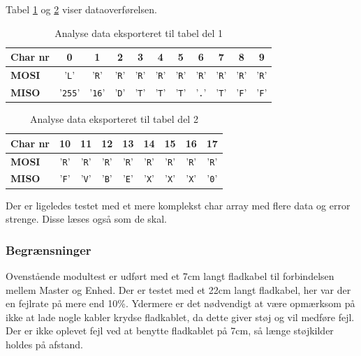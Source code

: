 Tabel \ref{table:scop_getlog1} og \ref{table:scop_getlog2} viser dataoverførelsen. 

\begin{table}[H]
	\caption{Analyse data eksporteret til tabel del 1}
	\centering
	\begin{tabular}{|l|c|c|c|c|c|c|c|c|c|c|}
		\hline 
		\textbf{Char nr} & \textbf{0} & \textbf{1} & \textbf{2} & \textbf{3} & \textbf{4} & \textbf{5} 
						 & \textbf{6} & \textbf{7} & \textbf{8} & \textbf{9}\\ 		
		\hline 
		\textbf{MOSI} & '\verb+L+' & '\verb+R+' & '\verb+R+' & '\verb+R+' & '\verb+R+' & '\verb+R+' 
						& '\verb+R+' & '\verb+R+' & '\verb+R+' & '\verb+R+'\\ 
		\hline 
		\textbf{MISO} & '\verb+255+' & '\verb+16+' & '\verb+D+' & '\verb+T+' & '\verb+T+' & '\verb+T+' 
						& '\verb+.+' & '\verb+T+' & '\verb+F+' & '\verb+F+'\\
						 
		\hline 
	\end{tabular} 
	\label{table:scop_getlog1}
\end{table}


\begin{table}[H]
	\caption{Analyse data eksporteret til tabel del 2}
	\centering
	\begin{tabular}{|l|c|c|c|c|c|c|c|c|}
		\hline 
		\textbf{Char nr} & \textbf{10} & \textbf{11} & \textbf{12} & \textbf{13}
						& \textbf{14} & \textbf{15} & \textbf{16} & \textbf{17}\\ 		
		\hline 
		\textbf{MOSI} 	& '\verb+R+' & '\verb+R+' & '\verb+R+' & '\verb+R+'
						& '\verb+R+' & '\verb+R+' & '\verb+R+' & '\verb+R+' \\ 
		\hline 
		\textbf{MISO}	& '\verb+F+' & '\verb+V+' & '\verb+B+' & '\verb+E+'
						& '\verb+X+' & '\verb+X+' & '\verb+X+' & '\verb+0+'\\
						 
		\hline 
	\end{tabular} 
	\label{table:scop_getlog2}
\end{table}

Der er ligeledes testet med et mere komplekst char array med flere data og error strenge. Disse læses også som de skal. 

\subsubsection*{Begrænsninger}

Ovenstående modultest er udført med et 7cm langt fladkabel til forbindelsen mellem Master og Enhed. Der er testet med et 22cm langt fladkabel, her var der en fejlrate på mere end 10\%. Ydermere er det nødvendigt at være opmærksom på ikke at lade nogle kabler krydse fladkablet, da dette giver støj og vil medføre fejl. Der er ikke oplevet fejl ved at benytte fladkablet på 7cm, så længe støjkilder holdes på afstand.   